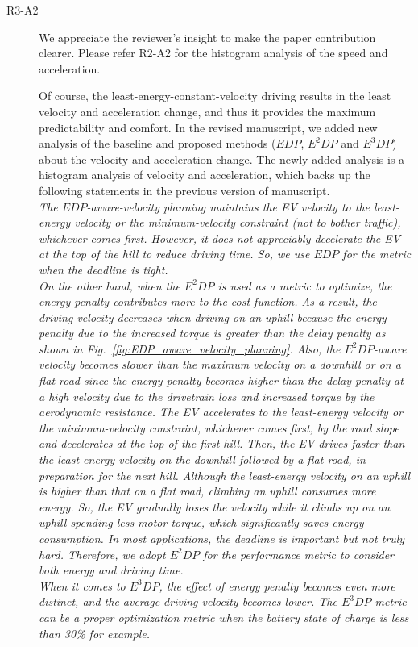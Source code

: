 \documentclass[onecolumn]{IEEEconf}
\begin{document}
\begin{description}
\item [R3-A2] We appreciate the reviewer's insight to make the paper contribution clearer. Please refer R2-A2 for the histogram analysis of the speed and acceleration. 

Of course, the least-energy-constant-velocity driving results in the least velocity and acceleration change, and thus it provides the maximum predictability and comfort. In the revised manuscript, we added new analysis of the baseline and proposed methods ($EDP$, $E^2DP$ and $E^3DP$) about the velocity and acceleration change. The newly added analysis is a histogram analysis of velocity and acceleration, which backs up the following statements in the previous version of manuscript.\\

\textit{The $EDP$-aware-velocity planning maintains the EV velocity to the least-energy velocity or the minimum-velocity constraint (not to bother traffic), whichever comes first. However, it does not appreciably decelerate the EV at the top of the hill to reduce driving time. So, we use $EDP$ for the metric when the deadline is tight. \\
On the other hand, when the $E^2DP$ is used as a metric to optimize, the energy penalty contributes more to the cost function. As a result, the driving velocity decreases when driving on an uphill because the energy penalty due to the increased torque is greater than the delay penalty as shown in Fig.~\ref{fig:EDP_aware_velocity_planning}. Also, the $E^2DP$-aware velocity becomes slower than the maximum velocity on a downhill or on a flat road since the energy penalty becomes higher than the delay penalty at a high velocity due to the drivetrain loss and increased torque by the aerodynamic resistance. The EV accelerates to the least-energy velocity or the minimum-velocity constraint, whichever comes first, by the road slope and decelerates at the top of the first hill. Then, the EV drives faster than the least-energy velocity on the downhill followed by a  flat road, in preparation for the next hill. Although the least-energy velocity on an uphill is higher than that on a flat road, climbing an uphill consumes more energy. So, the EV gradually loses the velocity while it climbs up on an uphill spending less motor torque, which significantly saves energy consumption. In most applications, the deadline is important but not truly hard. Therefore, we adopt $E^2DP$ for the performance metric to consider both energy and driving time.\\
When it comes to $E^3DP$, the effect of energy penalty becomes even more distinct, and the average driving velocity becomes lower. The $E^3DP$ metric can be a proper optimization metric when the battery state of charge is less than 30\% for example.}



\end{description}
\end{document}
